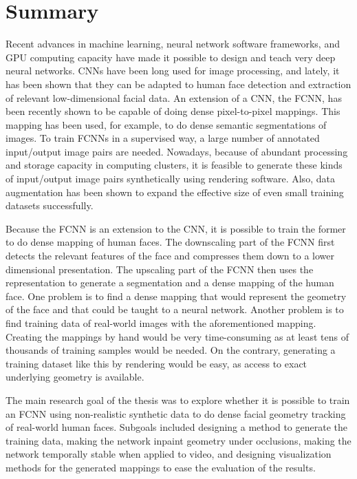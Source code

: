 \chapter{Summary}

Recent advances in machine learning, neural network software frameworks, and \ac{GPU} computing capacity have made it possible to design and teach very deep neural networks. \acfp{CNN} have been long used for image processing, and lately, it has been shown that they can be adapted to human face detection and extraction of relevant low-dimensional facial data. An extension of a \ac{CNN}, the \acf{FCNN}, has been recently shown to be capable of doing dense pixel-to-pixel mappings. This mapping has been used, for example, to do dense semantic segmentations of images. To train \acp{FCNN} in a supervised way, a large number of annotated input/output image pairs are needed. Nowadays, because of abundant processing and storage capacity in computing clusters, it is feasible to generate these kinds of input/output image pairs synthetically using rendering software. Also, data augmentation has been shown to expand the effective size of even small training datasets successfully.

Because the \ac{FCNN} is an extension to the \ac{CNN}, it is possible to train the former to do dense mapping of human faces. The downscaling part of the \ac{FCNN} first detects the relevant features of the face and compresses them down to a lower dimensional presentation. The upscaling part of the \ac{FCNN} then uses the representation to generate a segmentation and a dense mapping of the human face. One problem is to find a dense mapping that would represent the geometry of the face and that could be taught to a neural network. Another problem is to find training data of real-world images with the aforementioned mapping. Creating the mappings by hand would be very time-consuming as at least tens of thousands of training samples would be needed. On the contrary, generating a training dataset like this by rendering would be easy, as access to exact underlying geometry is available.

The main research goal of the thesis was to explore whether it is possible to train an \ac{FCNN} using non-realistic synthetic data to do dense facial geometry tracking of real-world human faces. Subgoals included designing a method to generate the training data, making the network inpaint geometry under occlusions, making the network temporally stable when applied to video, and designing visualization methods for the generated mappings to ease the evaluation of the results.

